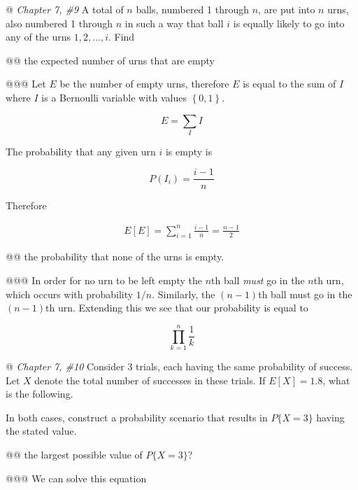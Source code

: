 \documentclass[11pt]{article}\usepackage[]{graphicx}\usepackage[]{xcolor}
\begin{document}
\begin{easylist}[enumerate]
    @ \textit{Chapter 7, \#9} A total of $n$ balls, numbered 1 through $n$, are put into $n$ urns, also numbered 1
    through $n$ in such a way that ball $i$ is equally likely to go into any of the urns $1, 2, \ldots, i$. Find

    @@ the expected number of urns that are empty

    @@@ Let $E$ be the number of empty urns, therefore $E$ is equal to the sum of $I$ where $I$ is a Bernoulli variable
    with values $\left\{ 0,1 \right\}$.

    \begin{equation}
        E = \sum\limits_I I
    \end{equation}

    The probability that any given urn $i$ is empty is

    \begin{equation}
        P(I_i) = \frac{i - 1}{n}
    \end{equation}

    Therefore

    \begin{equation}
        \begin{aligned}
            E[E] = \sum_{i=1}^n \frac{i - 1}{n} = \frac{n-1}{2}
        \end{aligned}
    \end{equation}

    @@ the probability that none of the urns is empty.

    @@@ In order for no urn to be left empty the $n$th ball \textit{must} go in the $n$th urn, which occurs with
    probability $1/n$. Similarly, the $(n-1)$th ball must go in the $(n-1)$th urn. Extending this we see that our
    probability is equal to

    \begin{equation}
        \prod_{k=1}^n \frac{1}{k}
    \end{equation}

    @ \textit{Chapter 7, \#10} Consider 3 trials, each having the same probability of success. Let $X$ denote the total
    number of successes in these trials. If $E[X] = 1.8$, what is the following. \newline

    In both cases, construct a probability scenario that results in $P\{X = 3\}$ having the stated value.

    @@ the largest possible value of $P\{X = 3\}$?

    @@@ We can solve this equation


\end{easylist}
\end{document}
